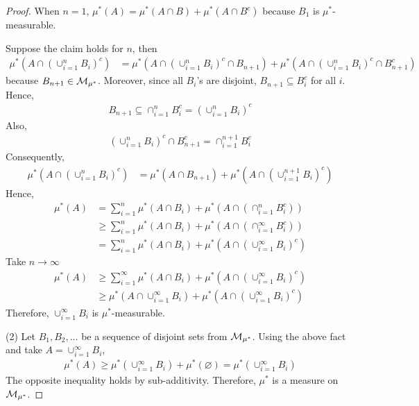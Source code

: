 \documentclass[11pt]{article}
\begin{document}
\begin{proof}
		When $n = 1$, $\mu^*(A) = \mu^*(A \cap B) + \mu^*(A \cap B^c)$ because $B_1$ is $\mu^*$-measurable.
		
		Suppose the claim holds for $n$, then
		\begin{align}
			\mu^*(A \cap (\cup_{i=1}^n B_i)^c) &= \mu^*(A \cap (\cup_{i=1}^n B_i)^c \cap B_{n+1}) + \mu^*(A \cap (\cup_{i=1}^n B_i)^c \cap B_{n+1}^c)
		\end{align}
		because $B_{n+1} \in \mathcal{{M}}_{\mu^*}$. Moreover, since all $B_i$'s are disjoint, $B_{n+1} \subseteq B_{i}^c$ for all $i$.
		Hence, 
		\begin{align}
			B_{n+1} \subseteq \cap_{i=1}^n B_i^c = (\cup_{i=1}^n B_i)^c
		\end{align}
		Also,
		\begin{align}
			(\cup_{i=1}^n B_i)^c \cap B_{n+1}^c = \cap_{i=1}^{n+1} B_i^c
		\end{align}
		Consequently,
		\begin{align}
			\mu^*(A \cap (\cup_{i=1}^n B_i)^c) &= \mu^*(A \cap B_{n+1}) + \mu^*(A \cap (\cup_{i=1}^{n+1} B_i)^c)
		\end{align}
		Hence,
		\begin{align}
			\mu^*(A) &= \sum_{i=1}^n \mu^*(A \cap B_i) + \mu^*(A \cap (\cap_{i=1}^n B_i^c)) \\
			&\geq \sum_{i=1}^n \mu^*(A \cap B_i) + \mu^*(A \cap (\cap_{i=1}^\infty B_i^c)) \\
			&= \sum_{i=1}^n \mu^*(A \cap B_i) + \mu^*(A \cap (\cup_{i=1}^\infty B_i)^c) 
		\end{align}
		Take $n \to \infty$
		\begin{align}
			\mu^*(A) &\geq \sum_{i=1}^\infty \mu^*(A \cap B_i) + \mu^*(A \cap (\cup_{i=1}^\infty B_i)^c) \\
			&\geq \mu^*(A \cap \cup_{i=1}^\infty B_i) + \mu^*(A \cap (\cup_{i=1}^\infty B_i)^c)
		\end{align}
		Therefore, $\cup_{i=1}^\infty B_i$ is $\mu^*$-measurable.
		
		(2) Let $B_1, B_2, \dots$ be a sequence of disjoint sets from $\mathcal{{M}}_{\mu^*}$. Using the above fact and take $A = \cup_{i=1}^\infty B_i$,
		\begin{align}
			\mu^*(A) \geq \mu^*(\cup_{i=1}^\infty B_i) + \mu^*(\varnothing) = \mu^*(\cup_{i=1}^\infty B_i)
		\end{align}
		The opposite inequality holds by sub-additivity. Therefore, $\mu^*$ is a measure on $\mathcal{{M}}_{\mu^*}$.
	\end{proof}
	
\end{document}
